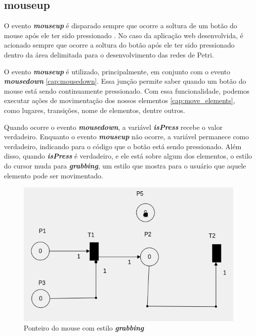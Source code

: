 \documentclass[
	12pt,				%
	openright,			%
	oneside,			%
	a4paper,			%
	english,			%
	brazil				%
	]{abntex2}
\begin{document}
\subsection*{mouseup}\label{cap:mouseup}

O evento \textbf{\textit{mouseup}} é disparado sempre que ocorre a soltura de um botão do mouse após ele ter sido pressionado \cite{mdn_mouseup_event}. No caso da aplicação web desenvolvida, é acionado sempre que ocorre a soltura do botão após ele ter sido pressionado dentro da área delimitada para o desenvolvimento das redes de Petri.



O evento \textbf{\textit{mouseup}} é utilizado, principalmente, em conjunto com o evento \textbf{\textit{mousedown}} \ref{cap:mousedown}. Essa junção permite saber quando um botão do mouse está sendo continuamente pressionado. Com essa funcionalidade, podemos executar ações de movimentação dos nossos elementos \ref{cap:move_elements}, como lugares, transições, nome de elementos, dentre outros. 



Quando ocorre o evento \textbf{\textit{mousedown}}, a variável \textbf{\textit{isPress}} recebe o valor verdadeiro. Enquanto o evento \textbf{\textit{mouseup}} não ocorre, a variável permanece como verdadeiro, indicando para o código que o botão está sendo pressionado. Além disso, quando \textbf{\textit{isPress}} é verdadeiro, e ele está sobre algum dos elementos, o estilo do cursor muda para \textbf{\textit{grabbing}}, um estilo que mostra para o usuário que aquele elemento pode ser movimentado. 

\begin{figure}[ht] 
	\centering
	\includegraphics[scale=0.4]{figuras/mouse_estilo_grabbing.png}
	\caption[Mouse estilo grabbing]{Ponteiro do mouse com estilo \textbf{\textit{grabbing}}}
	\label{fig:mouse_estilo_grabbing}
\end{figure}
\end{document}

